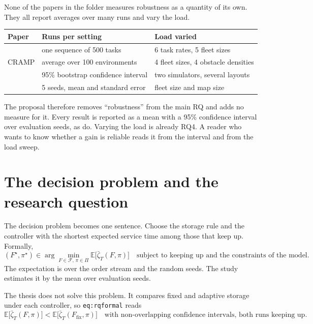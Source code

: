 \documentclass[11pt,a4paper]{article}
\begin{document}
None of the papers in the folder measures robustness as a quantity of its
own. They all report averages over many runs and vary the load.

\noindent\begin{tabularx}{\linewidth}{@{}lYY@{}}
  \toprule
  Paper & Runs per setting & Load varied \\
  \midrule
  \citet{ma2017lifelong_mapf} & one sequence of 500 tasks & 6 task rates, 5 fleet sizes \\
  CRAMP & average over 100 environments & 4 fleet sizes, 4 obstacle densities \\
  \citet{krnjaic2022warehouse_marl} & 95\% bootstrap confidence interval & two simulators, several layouts \\
  \citet{lau2022mapd} & 5 seeds, mean and standard error & fleet size and map size \\
  \bottomrule
\end{tabularx}
\medskip

\noindent The proposal therefore removes ``robustness'' from the main RQ
and adds no measure for it. Every result is reported as a mean with a 95\%
confidence interval over evaluation seeds, as \citet{krnjaic2022warehouse_marl}
do. Varying the load is already RQ4. A reader who wants to know whether a
gain is reliable reads it from the interval and from the load sweep.

\section{The decision problem and the research question}
\label{sec:formal}

The decision problem becomes one sentence. Choose the storage rule and the
controller with the shortest expected service time among those that keep
up. Formally,
\[
  (F^\star,\pi^\star) \in \arg\min_{F\in\mathcal{F},\,\pi\in\Pi}
  \mathbb{E}\bigl[\bar\zeta_T(F,\pi)\bigr]
  \quad\text{subject to keeping up and the constraints of the model.}
\]
The expectation is over the order stream and the random seeds. The study
estimates it by the mean over evaluation seeds.

The thesis does not solve this problem. It compares fixed and adaptive
storage under each controller, so \texttt{eq:rqformal} reads
\[
  \mathbb{E}\bigl[\bar\zeta_T(F,\pi)\bigr] <
  \mathbb{E}\bigl[\bar\zeta_T(F_{\mathrm{fix}},\pi)\bigr]
  \quad\text{with non-overlapping confidence intervals, both runs keeping up.}
\]
\end{document}
